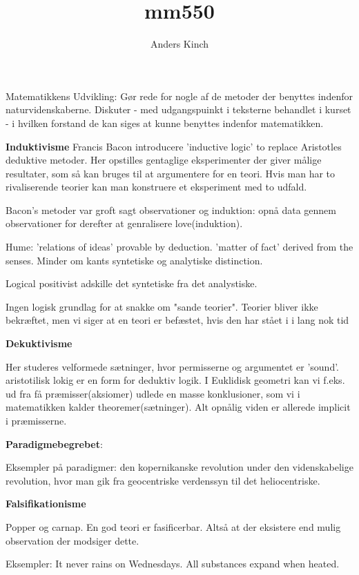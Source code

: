 \documentclass[12pt, twoside,a4paper]{article}
\title{mm550}
\author{Anders Kinch}
\date {}
\begin{document}
\maketitle

Matematikkens Udvikling: Gør rede for nogle af de metoder der benyttes indenfor naturvidenskaberne. Diskuter - med udgangspuinkt i teksterne behandlet i kurset - i hvilken forstand de kan siges at kunne benyttes indenfor matematikken. 

\textbf{Induktivisme}
Francis Bacon introducere 'inductive logic' to replace Aristotles deduktive metoder.  
Her opstilles gentaglige eksperimenter der giver målige resultater, som så kan bruges til at 
argumentere for en teori. Hvis man har to rivaliserende teorier kan man konstruere et eksperiment med to udfald. 

Bacon's metoder var groft sagt observationer og induktion: opnå data gennem observationer for derefter at genralisere love(induktion).  

Hume: 'relations of ideas' provable by deduction. 'matter of fact' derived from the senses. Minder om kants syntetiske og analytiske distinction.

Logical positivist adskille det syntetiske fra det analystiske. 

Ingen logisk grundlag for at snakke om "sande teorier". Teorier bliver ikke bekræftet, men vi siger at en teori er befæstet, hvis den har stået i
i lang nok tid



\textbf{Dekuktivisme}

Her studeres velformede sætninger, hvor permisserne og argumentet er 'sound'. aristotilisk lokig er en form for deduktiv logik. I Euklidisk geometri kan vi f.eks. ud fra få præmisser(aksiomer) udlede en masse konklusioner, som vi i matematikken kalder theoremer(sætninger). 
Alt opnålig viden er allerede implicit i præmisserne.



\textbf{Paradigmebegrebet}:

Eksempler på paradigmer: den kopernikanske revolution under den videnskabelige revolution, hvor man gik fra geocentriske verdenssyn til det heliocentriske. 



\textbf{Falsifikationisme}

Popper og carnap. En god teori er fasificerbar. Altså at der eksistere end mulig observation der modsiger dette.

Eksempler: It never rains on Wednesdays.
All substances expand when heated.

\medskip

\nocite{*}
%
%

\end{document}
